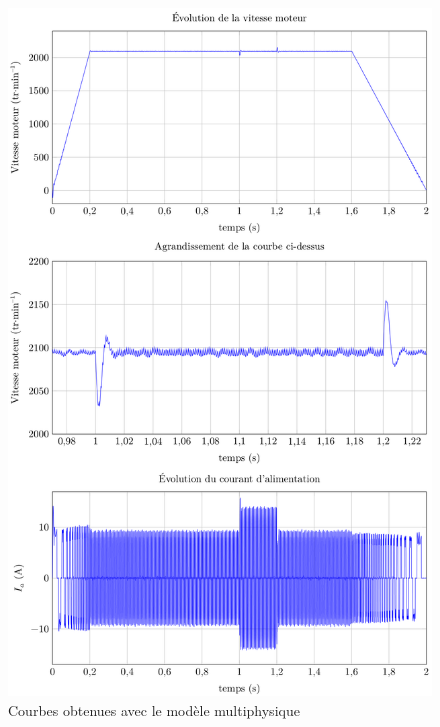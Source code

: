 \begin{figure}[!ht]
\begin{center}
 \includegraphics[width=0.8\linewidth]{img/fig25.png}
 \end{center}
  \caption{Courbes obtenues avec le modèle multiphysique}
\label{fig25}
\end{figure}

\cleardoublepage

\ifdef{\public}{\pagestyle{documentreponse}}{\pagestyle{correction}}


